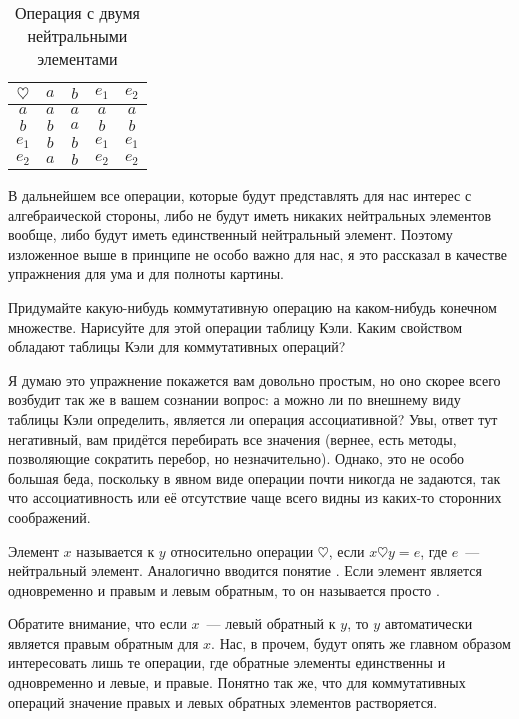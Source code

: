 \begin{table}[h]\label{tb:alg_2neutr}
\centering
\begin{tabular}{c|cccc}
$\heartsuit$ & $a$ & $b$ & $e_1$ & $e_2$ \\
\hline
$a$ & $a$ & $a$ & $a$ & $a$ \\
$b$ & $b$ & $a$ & $b$ & $b$ \\
$e_1$ & $b$ & $b$ & $e_1$ & $e_1$ \\
$e_2$ & $a$ & $b$ & $e_2$ & $e_2$
\end{tabular}
\caption{Операция с двумя нейтральными элементами}
\end{table}

В дальнейшем все операции, которые будут представлять для нас интерес с алгебраической стороны, либо не будут иметь никаких нейтральных элементов вообще, либо будут иметь единственный нейтральный элемент. Поэтому изложенное выше в принципе не особо важно для нас, я это рассказал в качестве упражнения для ума и для полноты картины.

\begin{exercise}
Придумайте какую-нибудь коммутативную операцию на каком-нибудь конечном множестве. Нарисуйте для этой операции таблицу Кэли. Каким свойством обладают таблицы Кэли для коммутативных операций?
\end{exercise}

Я думаю это упражнение покажется вам довольно простым, но оно скорее всего возбудит так же в вашем сознании вопрос: а можно ли по внешнему виду таблицы Кэли определить, является ли операция ассоциативной? Увы, ответ тут негативный, вам придётся перебирать все значения (вернее, есть методы, позволяющие сократить перебор, но незначительно). Однако, это не особо большая беда, поскольку в явном виде операции почти никогда не задаются, так что ассоциативность или её отсутствие чаще всего видны из каких-то сторонних соображений.

\begin{definition}
Элемент $x$ называется  к $y$ относительно операции $\heartsuit$, если
$x\heartsuit y = e$, 
где $e$~--- нейтральный элемент. Аналогично вводится понятие . Если элемент является одновременно и правым и левым обратным, то он называется просто .
\end{definition}

Обратите внимание, что если $x$~--- левый обратный к $y$, то $y$ автоматически является правым обратным для $x$. Нас, в прочем, будут опять же главном образом интересовать лишь те операции, где обратные элементы единственны и одновременно и левые, и правые. Понятно так же, что для коммутативных операций значение правых и левых обратных элементов растворяется.

